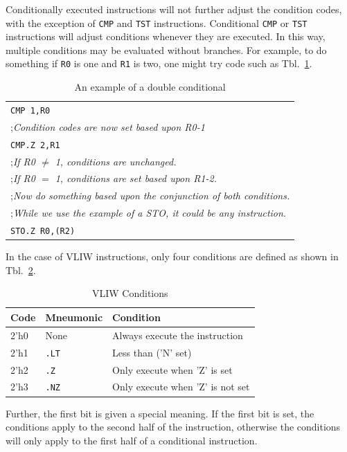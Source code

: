 \documentclass{gqtekspec}
\begin{document}
Conditionally executed instructions will not further adjust the 
condition codes, with the exception of \hbox{\tt CMP} and \hbox{\tt TST}
instructions.   Conditional \hbox{\tt CMP} or \hbox{\tt TST} instructions
will adjust conditions whenever they are executed.  In this way,
multiple conditions may be evaluated without branches.  For example, to do
something if \hbox{\tt R0} is one and \hbox{\tt R1} is two, one might try
code such as Tbl.~\ref{tbl:dbl-condition}.
\begin{table}\begin{center}
\begin{tabular}{l}
	{\tt CMP 1,R0} \\
	{;\em Condition codes are now set based upon R0-1} \\
	{\tt CMP.Z 2,R1} \\
	{;\em If R0 $\neq$ 1, conditions are unchanged.} \\
	{;\em If R0 $=$ 1, conditions are set based upon R1-2.} \\
	{;\em Now do something based upon the conjunction of both conditions.} \\
	{;\em While we use the example of a STO, it could be any instruction.} \\
	{\tt STO.Z R0,(R2)} \\
\end{tabular}
\caption{An example of a double conditional}\label{tbl:dbl-condition}
\end{center}\end{table}

In the case of VLIW instructions, only four conditions are defined as shown 
in Tbl.~\ref{tbl:vliw-conditions}.
\begin{table}\begin{center}
\begin{tabular}{l|l|l}
Code & Mneumonic & Condition \\\hline
2'h0 & None & Always execute the instruction \\
2'h1 & {\tt .LT} & Less than ('N' set) \\
2'h2 & {\tt .Z} & Only execute when 'Z' is set \\
2'h3 & {\tt .NZ} & Only execute when 'Z' is not set \\
\end{tabular}
\caption{VLIW Conditions}\label{tbl:vliw-conditions}
\end{center}\end{table}
Further, the first bit is given a special meaning.  If the first bit is set,
the conditions apply to the second half of the instruction, otherwise the
conditions will only apply to the first half of a conditional instruction.
\end{document}
